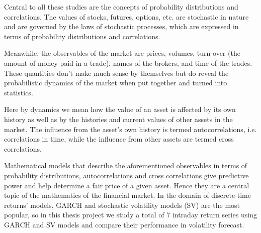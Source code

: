 \documentclass{report}
\begin{document}
Central to all these studies are the concepts of probability
distributions and correlations. The values of stocks, futures,
options, etc. are stochastic in nature and are governed by the laws of
stochastic processes, which are expressed in terms of probability
distributions and correlations.

Meanwhile, the observables of the market are prices, volumes,
turn-over (the amount of money paid in a trade), names of the brokers,
and time of the trades. These quantities don't make much sense
by themselves but do reveal the probabilistic dynamics of the market
when put together and turned into statistics.

Here by dynamics we mean how the value of an asset is affected by its
own history as well as by the histories and current values of other
assets in the market. The influence from the asset's own history is
termed autocorrelations, i.e. correlations in time, while
the influence from other assets are termed cross correlations.

Mathematical models that describe the aforementioned observables in
terms of probability distributions, autocorrelations and cross
correlations give predictive power and help determine a fair price of
a given asset. Hence they are a central topic of the mathematics of
the financial market. In the domain of discrete-time returns' models,
GARCH and stochastic volatility models (SV) are the most popular, so in
this thesis project we study a total of 7 intraday return series 
using GARCH and SV models and compare their performance in volatility
forecast.




\end{document}
